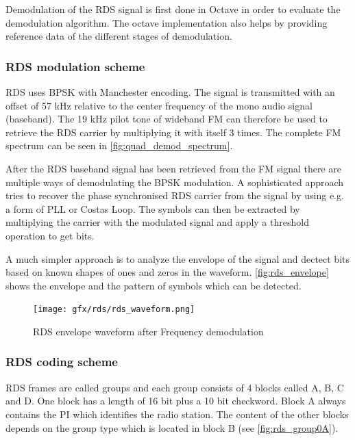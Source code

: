 Demodulation of the \ac{RDS} signal is first done in Octave in order to
evaluate the demodulation algorithm. The octave implementation
also helps by providing reference data of the different stages
of demodulation. 

\subsubsection{RDS modulation scheme}
\label{sec:rds_modulation_scheme}

\ac{RDS} uses \ac{BPSK} with Manchester encoding. The signal is
transmitted with an offset of 57 kHz relative to the center frequency
of the mono audio signal (baseband). The 19 kHz pilot tone of wideband \ac{FM}
can therefore be used to retrieve the \ac{RDS} carrier by multiplying
it with itself 3 times. The complete FM spectrum can be seen in
\autoref{fig:quad_demod_spectrum}.

After the \ac{RDS} baseband signal has been retrieved from the \ac{FM} signal
there are multiple ways of demodulating the \ac{BPSK} modulation. A sophisticated
approach tries to recover the phase synchronised \ac{RDS} carrier from the
signal by using e.g. a form of \ac{PLL} or Costas Loop. The symbols can then
be extracted by multiplying the carrier with the modulated signal and apply
a threshold operation to get bits.

A much simpler approach is to analyze the envelope of the signal and dectect
bits based on known shapes of ones and zeros in the waveform.
\autoref{fig:rds_envelope} shows the envelope and the pattern of symbols
which can be detected.

\begin{figure}
	\centering
	\texttt{[image: gfx/rds/rds\_waveform.png]}
	\caption[RDS envelope waveform after Frequency demodulation]{RDS envelope waveform after Frequency demodulation \cite{1999:iec62106}}
	\label{fig:rds_envelope}
\end{figure}



\subsubsection{RDS coding scheme}

RDS frames are called groups and each group consists of 4 blocks called
A, B, C and D. One block has a length of 16 bit plus a 10 bit checkword.
Block A always contains the \ac{PI} which identifies the radio station.
The content of the other blocks depends on the group type which is located
in block B (see \autoref{fig:rds_group0A}).

